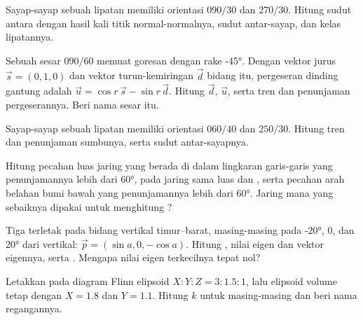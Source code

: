 \begin{exercise}[$\star$]\label{exo:b3:structural-analysis:3}
Sayap-sayap sebuah lipatan memiliki orientasi $090/30$ dan $270/30$. Hitung sudut antara
 dengan hasil kali titik normal-normalnya, sudut antar-sayap,
dan kelas lipatannya.
\end{exercise}

\begin{exercise}[$\star$]\label{exo:b3:structural-analysis:4}
Sebuah sesar $090/60$ memuat goresan dengan rake \ang{-45}. Dengan vektor jurus $\vec s = (0, 1, 0)$ dan vektor
turun-kemiringan $\vec d$ bidang itu, pergeseran
dinding gantung adalah $\vec u = \cos r\,\vec s - \sin r\,\vec d$. Hitung
$\vec d$, $\vec u$, serta tren dan penunjaman pergeserannya. Beri nama sesar itu.
\end{exercise}

\begin{exercise}[$\star\star$]\label{exo:b3:structural-analysis:5}
Sayap-sayap sebuah lipatan memiliki orientasi $060/40$ dan $250/30$. Hitung
tren dan penunjaman sumbunya, serta sudut antar-sayapnya.
\end{exercise}

\begin{exercise}[$\star\star$]\label{exo:b3:structural-analysis:6}
Hitung pecahan luas jaring yang berada di dalam lingkaran garis-garis
yang penunjamannya lebih dari \ang{60}, pada jaring sama luas dan , serta
pecahan arah belahan bumi bawah yang penunjamannya lebih dari \ang{60}.
Jaring mana yang sebaiknya dipakai untuk menghitung ?
\end{exercise}

\begin{exercise}[$\star\star$]\label{exo:b3:structural-analysis:7}
Tiga  terletak pada bidang vertikal timur--barat, masing-masing pada \ang{-20}, $0$, dan
\ang{20} dari vertikal: $\vec p = (\sin a, 0, -\cos a)$. Hitung ,
nilai eigen dan vektor eigennya, serta . Mengapa
nilai eigen terkecilnya tepat nol?
\end{exercise}

\begin{exercise}[$\star\star$]\label{exo:b3:structural-analysis:8}
Letakkan pada diagram Flinn elipsoid $X : Y : Z = 3 : 1.5 : 1$, lalu elipsoid volume tetap
dengan $X = 1.8$ dan $Y = 1.1$. Hitung $k$ untuk
masing-masing dan beri nama regangannya.
\end{exercise}

